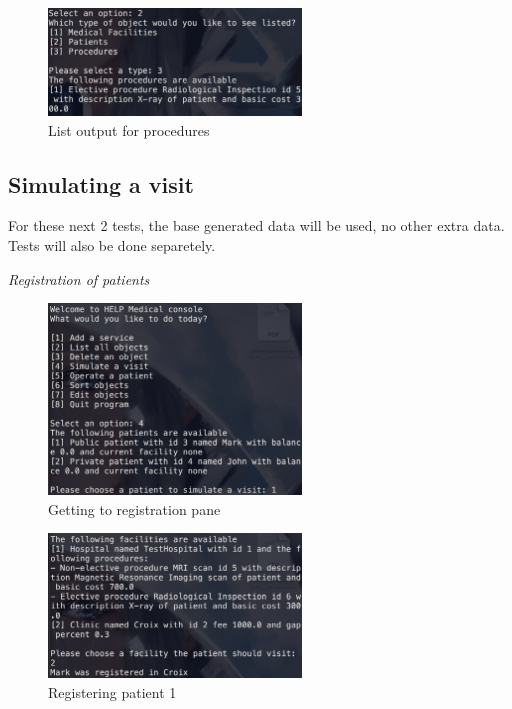 \documentclass{article}
\begin{document}
	\begin{figure}
		\begin{center}
			\includegraphics[width=0.6\textwidth]{figures/Deleting/After_deletion_list_03.png}
		\end{center}
		\caption{List output for procedures}\label{fig:after_deletion_03}
	\end{figure}

	\subsection{Simulating a visit}\label{sub:simulating_a_visit} %
	For these next 2 tests, the base generated data will be used, no other extra data. Tests will also be done separetely.

	\newpage 

	\textit{Registration of patients}
	\begin{figure}
		\begin{center}
			\includegraphics[width=0.6\textwidth]{figures/Visiting/Register_patients_01.png}
		\end{center}
		\caption{Getting to registration pane}\label{fig:register_patients_01}
	\end{figure}

	\begin{figure}
		\begin{center}
			\includegraphics[width=0.6\textwidth]{figures/Visiting/Register_patients_02.png}
		\end{center}
		\caption{Registering patient 1}\label{fig:register_patients_02}
	\end{figure}
	
\end{document}
